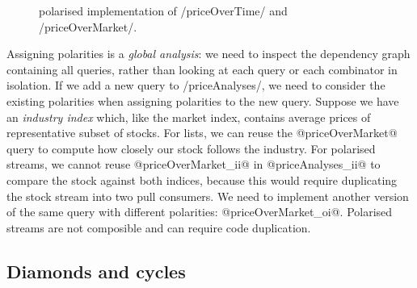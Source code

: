 \begin{figure}
\caption[Polarised implementation of priceOverTime and priceOverMarket]{polarised implementation of \Hs/priceOverTime/ and \Hs/priceOverMarket/.}
\label{figs/impl/polar/priceOverTime-priceOverMarket}
\end{figure}

Assigning polarities is a \emph{global analysis}: we need to inspect the dependency graph containing all queries, rather than looking at each query or each combinator in isolation.
If we add a new query to \Hs/priceAnalyses/, we need to consider the existing polarities when assigning polarities to the new query.
Suppose we have an \emph{industry index} which, like the market index, contains average prices of representative subset of stocks.
For lists, we can reuse the @priceOverMarket@ query to compute how closely our stock follows the industry.
For polarised streams, we cannot reuse @priceOverMarket_ii@ in @priceAnalyses_ii@ to compare the stock against both indices, because this would require duplicating the stock stream into two pull consumers.
We need to implement another version of the same query with different polarities: @priceOverMarket_oi@.
Polarised streams are not composible and can require code duplication.

\subsection{Diamonds and cycles}

